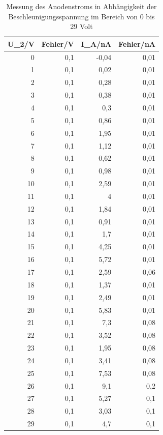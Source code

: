 \documentclass[12pt,a4paper]{article}
\begin{document}
\begin{table}[H]
\caption{Messung des Anodenstroms in Abhängigkeit der Beschleunigungsspannung im Bereich von 0 bis 29 Volt}
\begin{center}
\begin{tabular}{|r|r|r|r|}
\hline
\multicolumn{1}{|l|}{U\_2/V} & \multicolumn{1}{l|}{Fehler/V} & \multicolumn{1}{l|}{I\_A/nA} & \multicolumn{1}{l|}{Fehler/nA} \\ \hline
0 & 0,1 & -0,04 & 0,01 \\ \hline
1 & 0,1 & 0,02 & 0,01 \\ \hline
2 & 0,1 & 0,28 & 0,01 \\ \hline
3 & 0,1 & 0,38 & 0,01 \\ \hline
4 & 0,1 & 0,3 & 0,01 \\ \hline
5 & 0,1 & 0,86 & 0,01 \\ \hline
6 & 0,1 & 1,95 & 0,01 \\ \hline
7 & 0,1 & 1,12 & 0,01 \\ \hline
8 & 0,1 & 0,62 & 0,01 \\ \hline
9 & 0,1 & 0,98 & 0,01 \\ \hline
10 & 0,1 & 2,59 & 0,01 \\ \hline
11 & 0,1 & 4 & 0,01 \\ \hline
12 & 0,1 & 1,84 & 0,01 \\ \hline
13 & 0,1 & 0,91 & 0,01 \\ \hline
14 & 0,1 & 1,7 & 0,01 \\ \hline
15 & 0,1 & 4,25 & 0,01 \\ \hline
16 & 0,1 & 5,72 & 0,01 \\ \hline
17 & 0,1 & 2,59 & 0,06 \\ \hline
18 & 0,1 & 1,37 & 0,01 \\ \hline
19 & 0,1 & 2,49 & 0,01 \\ \hline
20 & 0,1 & 5,83 & 0,01 \\ \hline
21 & 0,1 & 7,3 & 0,08 \\ \hline
22 & 0,1 & 3,52 & 0,08 \\ \hline
23 & 0,1 & 1,95 & 0,08 \\ \hline
24 & 0,1 & 3,41 & 0,08 \\ \hline
25 & 0,1 & 7,53 & 0,08 \\ \hline
26 & 0,1 & 9,1 & 0,2 \\ \hline
27 & 0,1 & 5,27 & 0,1 \\ \hline
28 & 0,1 & 3,03 & 0,1 \\ \hline
29 & 0,1 & 4,7 & 0,1 \\ \hline
\end{tabular}
\end{center}
\label{tab:q_daten}
\end{table}
\end{document}
